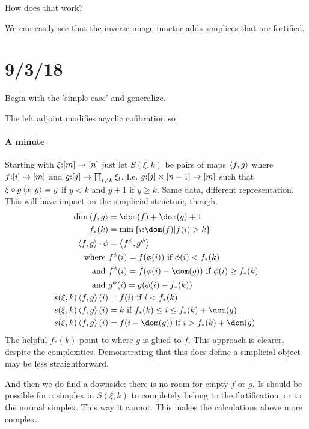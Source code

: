 \documentclass[csh.tex]{subfiles}
\begin{document}
How does that work?

We can easily see that the inverse image functor adds simplices that are fortified.

\section{9/3/18}

Begin with the 'simple case' and generalize.

The left adjoint modifies acyclic cofibration so 

\paragraph{A minute}
Starting with $\xi\mathord :[m]\to[n]$ just let $S(\xi,k)$ be pairs of maps $\left\langle f,g \right\rangle$ where $f\mathord : [i]\to[m]$ and $g\mathord : [j] \to \prod_{l\neq k} \xi_l$. I.e. $g\mathord :[j]\times[n-1] \to [m]$ such that $\xi \circ g\left\langle x,y \right\rangle = y$ if $y < k$ and $y+1$ if $y \geq k$.
Same data, different representation. This will have impact on the simplicial structure, though.
\begin{align*}
\dim\tuplet{f,g}&=\dom(f) + \dom(g) + 1\\
f_*(k) &= \min\set{i\of\dom(f) | f(i) > k}\\ %
\tuplet{f,g}\cdot\phi &= \tuplet{f^\phi,g^\phi}\\
\textrm{where } &f^\phi(i) = f(\phi(i)) \textrm{ if } \phi(i) < f_*(k) \\
\textrm{and } &f^\phi(i) = f(\phi(i)-\dom(g)) \textrm{ if } \phi(i) \geq f_*(k) \\
\textrm{and } &g^\phi(i) = g(\phi(i)-f_*(k)) \\
s(\xi,k)\tuplet{f,g}(i) &= f(i) \textrm{ if } i < f_*(k)\\
s(\xi,k)\tuplet{f,g}(i) &= k \textrm{ if } f_*(k) \leq i \leq f_*(k) + \dom(g)\\
s(\xi,k)\tuplet{f,g}(i) &= f(i-\dom(g)) \textrm{ if } i > f_*(k) + \dom(g)
\end{align*}
The helpful $f_*(k)$ point to where $g$ is glued to $f$.
This approach is clearer, despite the complexities. Demonstrating that this does define a simplicial object may be less straightforward.

And then we do find a downside: there is no room for empty $f$ or $g$. Is should be possible for a simplex in $S(\xi,k)$ to completely belong to the fortification, or to the normal simplex. This way it cannot. This makes the calculations above more complex.
\end{document}
